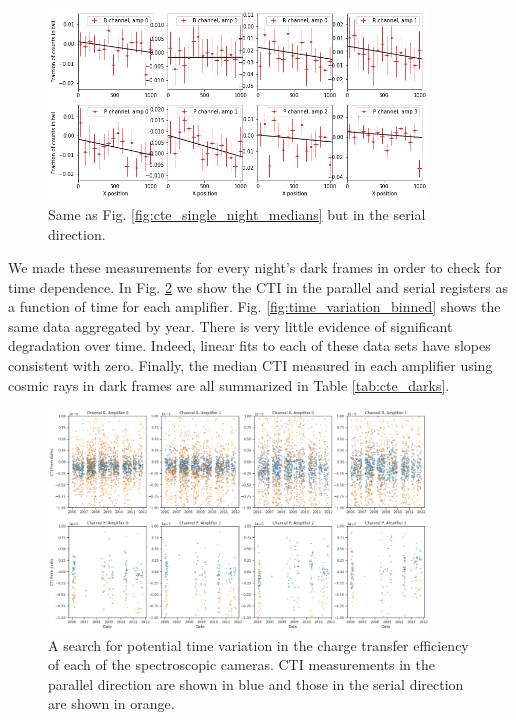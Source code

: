 \begin{figure}
    \centering
    \includegraphics[width=0.9\textwidth]{figures/cte/single_night_example_serial_medians.png}
    \caption{Same as Fig. \ref{fig:cte_single_night_medians} but in the serial direction.}
    \label{fig:cte_single_night_serial_medians}
\end{figure}

We made these measurements for every night's dark frames in order to check for time dependence. In Fig. \ref{fig:time_variation} we show the CTI in the parallel and serial registers as a function of time for each amplifier. Fig. \ref{fig:time_variation_binned} shows the same data aggregated by year. There is very little evidence of significant degradation over time. Indeed, linear fits to each of these data sets have slopes consistent with zero. Finally, the median CTI measured in each amplifier using cosmic rays in dark frames are all summarized in Table \ref{tab:cte_darks}.

\begin{figure}
    \centering
    \includegraphics[width=0.9\textwidth]{figures/cte/time_variation.png}
    \caption{A search for potential time variation in the charge transfer efficiency of each of the spectroscopic cameras. CTI measurements in the parallel direction are shown in blue and those in the serial direction are shown in orange.}
    \label{fig:time_variation}
\end{figure}

